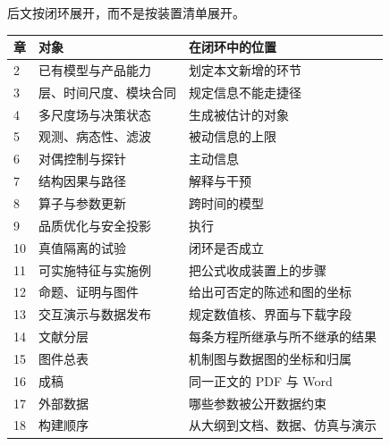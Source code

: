 后文按闭环展开，而不是按装置清单展开。

\begin{center}
\begin{tabularx}{\textwidth}{llX}
\toprule
章 & 对象 & 在闭环中的位置 \\
\midrule
2 & 已有模型与产品能力 & 划定本文新增的环节 \\
3 & 层、时间尺度、模块合同 & 规定信息不能走捷径 \\
4 & 多尺度场与决策状态 & 生成被估计的对象 \\
5 & 观测、病态性、滤波 & 被动信息的上限 \\
6 & 对偶控制与探针 & 主动信息 \\
7 & 结构因果与路径 & 解释与干预 \\
8 & 算子与参数更新 & 跨时间的模型 \\
9 & 品质优化与安全投影 & 执行 \\
10 & 真值隔离的试验 & 闭环是否成立 \\
11 & 可实施特征与实施例 & 把公式收成装置上的步骤 \\
12 & 命题、证明与图件 & 给出可否定的陈述和图的坐标 \\
13 & 交互演示与数据发布 & 规定数值核、界面与下载字段 \\
14 & 文献分层 & 每条方程所继承与所不继承的结果 \\
15 & 图件总表 & 机制图与数据图的坐标和归属 \\
16 & 成稿 & 同一正文的 PDF 与 Word \\
17 & 外部数据 & 哪些参数被公开数据约束 \\
18 & 构建顺序 & 从大纲到文档、数据、仿真与演示 \\
\bottomrule
\end{tabularx}
\end{center}
